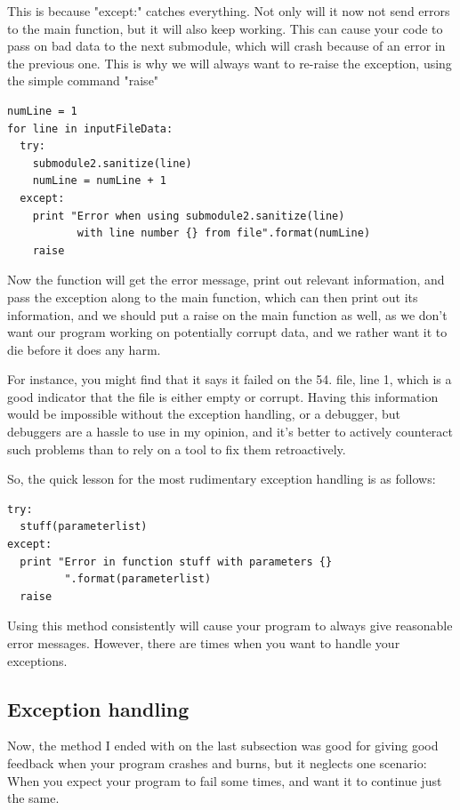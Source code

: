 \documentclass[10pt,a4paper]{article}
\begin{document}
This is because "except:" catches everything. Not only will it now not send errors to the main function, but it will also keep working. This can cause your code to pass on bad data to the next submodule, which will crash because of an error in the previous one. This is why we will always want to re-raise the exception, using the simple command "raise"


\begin{lstlisting}
numLine = 1
for line in inputFileData:
  try: 
    submodule2.sanitize(line)
    numLine = numLine + 1
  except:
    print "Error when using submodule2.sanitize(line) 
           with line number {} from file".format(numLine)
    raise

\end{lstlisting}

Now the function will get the error message, print out relevant information, and pass the exception along to the main function, which can then print out its information, and we should put a raise on the main function as well, as we don't want our program working on potentially corrupt data, and we rather want it to die before it does any harm. 

For instance, you might find that it says it failed on the 54. file, line 1, which is a good indicator that the file is either empty or corrupt. Having this information would be impossible without the exception handling, or a debugger, but debuggers are a hassle to use in my opinion, and it's better to actively counteract such problems than to rely on a tool to fix them retroactively.

So, the quick lesson for the most rudimentary exception handling is as follows:

\begin{lstlisting}
try: 
  stuff(parameterlist)
except:
  print "Error in function stuff with parameters {} 
         ".format(parameterlist) 
  raise
\end{lstlisting}

Using this method consistently will cause your program to always give reasonable error messages. However, there are times when you want to handle your exceptions.

\subsection{Exception handling}

Now, the method I ended with on the last subsection was good for giving good feedback when your program crashes and burns, but it neglects one scenario: When you expect your program to fail some times, and want it to continue just the same. 
\end{document}
